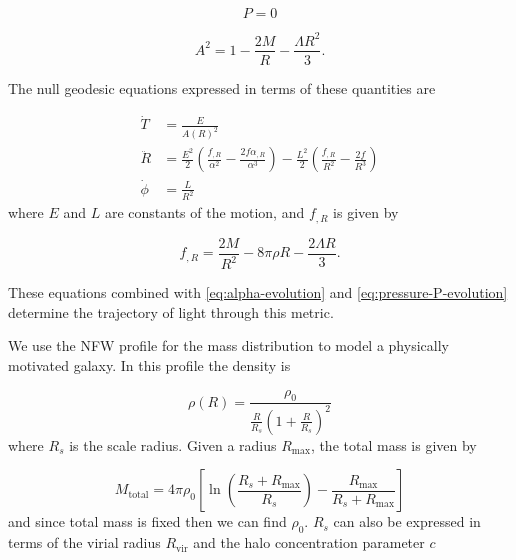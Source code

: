 \begin{equation}
  P = 0
\end{equation}

\begin{equation}
  A^2 = 1- \frac{2M}{R} - \frac{\Lambda R^2}{3}.
\end{equation}

The null geodesic equations expressed in terms of these quantities are

\begin{subequations}
  \begin{align}
    \dot{T} &= \frac{E}{A(R)^2}\\
    \ddot{R} &= \frac{E^2}{2}\left ( \frac{f_{,R}}{\alpha^2} - \frac{2f\alpha_{,R}}{\alpha^3} \right ) - \frac{L^2}{2} \left ( \frac{f_{,R}}{R^2} - \frac{2f}{R^3} \right )\\
    \dot{\phi} &= \frac{L}{R^2}
  \end{align}
  \label{eq:ltb-null-geodesics}
\end{subequations}
where $E$ and $L$ are constants of the motion, and $f_{,R}$ is given by

\begin{equation}
  f_{,R} = \frac{2M}{R^2} - 8\pi \rho R - \frac{2 \Lambda R}{3}.
\end{equation}

These equations combined with \autoref{eq:alpha-evolution} and \autoref{eq:pressure-P-evolution} determine the trajectory of light through this metric. 

We use the NFW profile \citep{navarro1996structure} for the mass distribution to model a physically motivated galaxy. In this profile the density is

\begin{equation}
  \rho(R) = \frac{\rho_0}{\frac{R}{R_s} \left ( 1 + \frac{R}{R_s} \right )^2}
  \label{eq:nfw-density}
\end{equation}
where $R_s$ is the scale radius. Given a radius $R_{\text{max}}$, the total mass is given by

\begin{equation}
  M_{\text{total}} = 4\pi \rho_0 \left [  \ln \left ( \frac{R_s + R_{\text{max}}}{R_s} \right ) - \frac{R_{\text{max}}}{R_s + R_{\text{max}}} \right ]
  \label{eq:nfw-total-mass}
\end{equation}
and since total mass is fixed then we can find $\rho_0$. $R_s$ can also be expressed in terms of the virial radius $R_{\text{vir}}$ and the halo concentration parameter $c$

